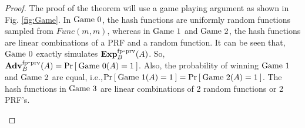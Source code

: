 \begin{proof}
The proof of the theorem will use a game playing argument as shown in Fig. \ref{fig:Game}. In $\text{Game 0}$, the hash functions are uniformly random functions sampled from $Func(m,m)$, whereas in $\text{Game 1}$ and $\text{Game 2}$, the hash functions are linear combinations of a PRF and a random function. It can be seen that, $\text{Game 0}$ exactly simulates $\mathrm{\mathbf{Exp}}^{\mathrm{fp\mbox{-}prv}}_{B}(A)$. So, $\mathrm{\mathbf{Adv}}^{\mathrm{fp\mbox{-}prv}}_{B}(A)=\Pr\left[\: \text{Game 0}(A)=1 \:\right]$. Also, the probability of winning $\text{Game 1}$ and $\text{Game 2}$ are equal, i.e.,$\Pr\left[\: \text{Game 1}(A)=1 \:\right]=\Pr\left[\: \text{Game 2}(A)=1 \:\right]$. The hash functions in $\text{Game 3}$ are linear combinations of 2 random functions or 2 PRF's. 

\begin{figure}[h]
\end{figure}
\end{proof}
